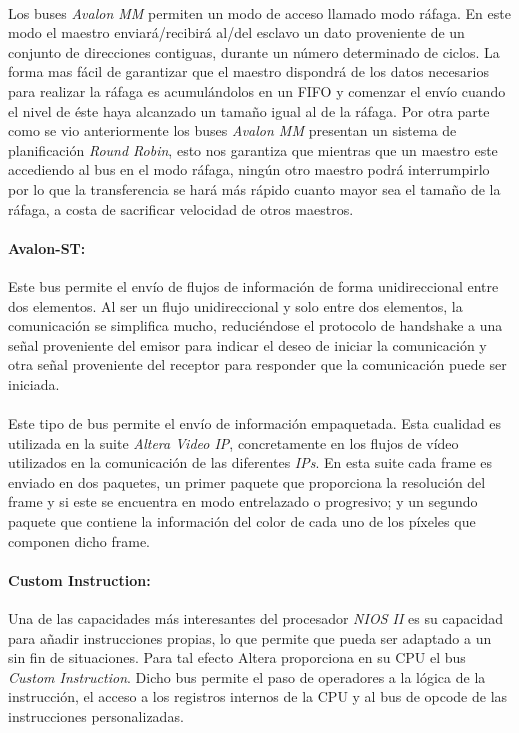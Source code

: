 \documentclass[a4paper,12pt,titlepage,final]{book}
\begin{document}
\paragraph{}
Los buses \textit{Avalon MM} permiten un modo de acceso llamado modo ráfaga. En este modo el maestro enviará/recibirá al/del esclavo un dato proveniente de un conjunto de direcciones contiguas, durante un número determinado de ciclos. La forma mas fácil de garantizar que el maestro dispondrá de los datos necesarios para realizar la ráfaga es acumulándolos en un FIFO y comenzar el envío cuando el nivel de éste haya alcanzado un tamaño igual al de la ráfaga. Por otra parte como se vio anteriormente los buses \textit{Avalon MM} presentan un sistema de planificación \textit{Round Robin}, esto nos garantiza que mientras que un maestro este accediendo al bus en el modo ráfaga, ningún otro maestro podrá interrumpirlo por lo que la transferencia se hará más rápido cuanto mayor sea el tamaño de la ráfaga, a costa de sacrificar velocidad de otros maestros. 

\paragraph{Avalon-ST:}
Este bus permite el envío de flujos de información de forma unidireccional entre dos elementos. Al ser un flujo unidireccional y solo entre dos elementos, la comunicación se simplifica mucho, reduciéndose el protocolo de handshake a una señal proveniente del emisor para indicar el deseo de iniciar la comunicación y otra señal proveniente del receptor para responder que la comunicación puede ser iniciada.

\paragraph{}
Este tipo de bus permite el envío de información empaquetada. Esta cualidad es utilizada en la suite \textit{Altera Video IP}, concretamente en los flujos de vídeo utilizados en la comunicación de las diferentes \textit{IPs}. En esta suite cada frame es enviado en dos paquetes, un primer paquete que proporciona la resolución del frame y si este se encuentra en modo entrelazado o progresivo; y un segundo paquete que contiene la información del color de cada uno de los píxeles que componen dicho frame. 

\paragraph{Custom Instruction:}
Una de las capacidades más interesantes del procesador \textit{NIOS II} es su capacidad para añadir instrucciones propias, lo que permite que pueda ser adaptado a un sin fin de situaciones. Para tal efecto Altera proporciona en su CPU el bus \textit{Custom Instruction}. Dicho bus permite el paso de operadores a la lógica de la instrucción, el acceso a los registros internos de la CPU y al bus de opcode de las instrucciones personalizadas.  
\end{document}
